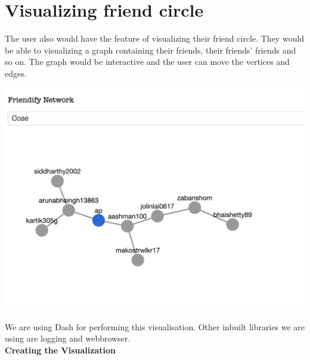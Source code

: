 \documentclass[11pt]{report}
\begin{document}
\newpage 

\section{Visualizing friend circle}

The user also would have the feature of visualizing their friend circle. They would be able to visualizing a graph containing their friends, their friends' friends and so on. The graph would be interactive and the user can move the vertices and edges. \\

\begin{center}
    \includegraphics[scale = .3]{Images/graph_ex.png}
\end{center}

We are using Dash for performing this visualisation. Other inbuilt libraries we are using are logging and webbrowser. \\

{\bf Creating the Visualization}
\end{document}

